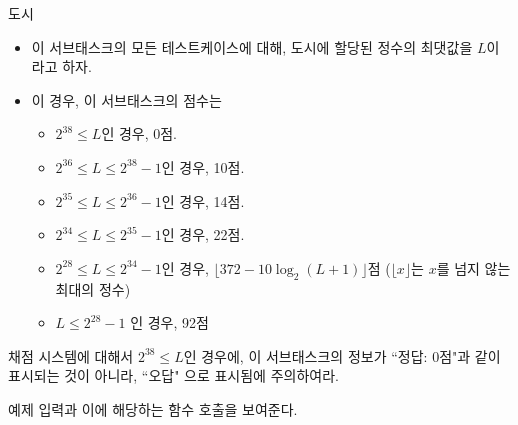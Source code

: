 \begin{problem}{도시}
	\begin{itemize}
		\item 이 서브태스크의 모든 테스트케이스에 대해, 도시에 할당된 정수의 최댓값을 $L$이라고 하자.
		\item 이 경우, 이 서브태스크의 점수는
		\begin{itemize}
			\item $2^{38} \le L$인 경우, 0점.
			\item $2^{36} \le L \le 2^{38}-1$인 경우, 10점.
			\item $2^{35} \le L \le 2^{36}-1$인 경우, 14점.
			\item $2^{34} \le L \le 2^{35}-1$인 경우, 22점.
			\item $2^{28} \le L \le 2^{34}-1$인 경우, $\lfloor372-10\log_2(L+1)\rfloor$점 ($\lfloor x \rfloor$는 $x$를 넘지 않는 최대의 정수)
			\item $L \le 2^{28}-1$ 인 경우, 92점
		\end{itemize}
	\end{itemize}
	
	채점 시스템에 대해서 $2^{38} \le L$인 경우에, 이 서브태스크의 정보가 ``정답: 0점"과 같이 표시되는 것이 아니라, ``오답" 으로 표시됨에 주의하여라.
	
	
	
	\Examples
	
	예제 입력과 이에 해당하는 함수 호출을 보여준다.
	
	
	

\end{problem}
